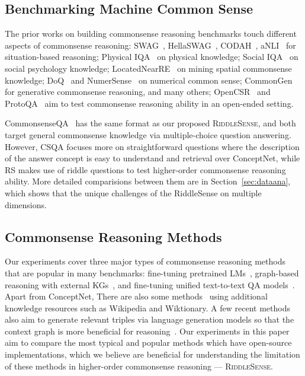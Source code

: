 
\subsection*{Benchmarking Machine Common Sense}
 
The prior works on building commonsense reasoning benchmarks touch different aspects of commonsense reasoning:
SWAG~\cite{Zellers2018SWAGAL}, HellaSWAG~\cite{Zellers2019HellaSwagCA}, CODAH~\cite{Chen2019CODAHAA}, aNLI~\cite{bhagavatula2019abductive} for situation-based reasoning;
Physical IQA~\cite{bisk2020piqa} on physical knowledge;
Social IQA~\cite{sap-etal-2019-social} on social psychology knowledge;
LocatedNearRE~\cite{Xu2018AutomaticEO} on mining spatial commonsense knowledge;
DoQ~\cite{elazar2019large} and NumerSense~\cite{lin2020birds} on numerical common sense;
CommonGen~\cite{lin2019commongen} for generative commonsense reasoning, and many others;
OpenCSR~\cite{lin2021opencsr} and ProtoQA~\cite{Boratko2020ProtoQAAQ} aim to test commonsense reasoning ability in an open-ended setting.

CommonsenseQA~\cite{Talmor2018CommonsenseQAAQ} has the same format as our proposed \textsc{RiddleSense}, and both target general commonsense knowledge via multiple-choice question answering.
However, CSQA focuses more on straightforward questions where the description of the answer concept is easy to understand and retrieval over ConceptNet, while RS makes use of riddle questions to test higher-order commonsense reasoning ability.
More detailed comparisions between them are in Section~\ref{sec:dataana}, which shows that the unique challenges of the RiddleSense on multiple dimensions.

\subsection*{Commonsense Reasoning Methods}
Our experiments cover three major types of commonsense reasoning methods that are popular in many benchmarks: fine-tuning pretrained LMs~\cite{Devlin2019, Liu2019RoBERTaAR, Lan2020ALBERT}, graph-based reasoning with external KGs~\cite{kagnet-emnlp19, feng2020scalable}, and fine-tuning unified text-to-text QA models~\cite{khashabi2020unifiedqa}.
Apart from ConceptNet, 
There are also some methods~\cite{lv2019graph, xu2020fusing}
using additional knowledge resources such as Wikipedia and Wiktionary.
A few recent methods also aim to generate relevant triples via language generation models so that the context graph is more beneficial for reasoning~\cite{wang2020connecting, yan2020learning}.
Our experiments in this paper aim to compare the most typical and popular methods which have open-source implementations,
which we believe are beneficial for understanding the limitation of these methods in higher-order commonsense reasoning --- \textsc{RiddleSense}.

